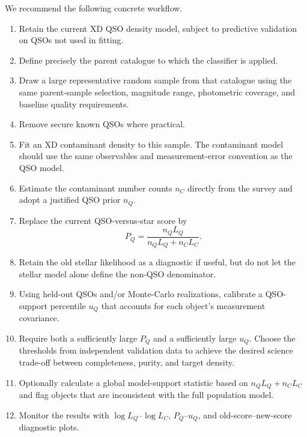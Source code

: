\documentclass[11pt]{article}
\begin{document}
We recommend the following concrete workflow.

\begin{enumerate}[label=\arabic*.]

\item Retain the current XD QSO density model, subject to predictive validation
on QSOs not used in fitting.

\item Define precisely the parent catalogue to which the classifier is
applied.

\item Draw a large representative random sample from that catalogue using the
same parent-sample selection, magnitude range, photometric coverage, and
baseline quality requirements.

\item Remove secure known QSOs where practical.

\item Fit an XD contaminant density to this sample. The contaminant model
should use the same observables and measurement-error convention as the QSO
model.

\item Estimate the contaminant number counts $n_C$ directly from the survey
and adopt a justified QSO prior $n_Q$.

\item Replace the current QSO-versus-star score by
%
\begin{equation}
\boxed{
P_Q
=
\frac{n_Q L_Q}
{n_Q L_Q+n_C L_C}
}.
\end{equation}

\item Retain the old stellar likelihood as a diagnostic if useful, but do not
let the stellar model alone define the non-QSO denominator.

\item Using held-out QSOs and/or Monte-Carlo realizations, calibrate a
QSO-support percentile $u_Q$ that accounts for each object's measurement
covariance.

\item Require both a sufficiently large $P_Q$ and a sufficiently large $u_Q$.
Choose the thresholds from independent validation data to achieve the desired
science trade-off between completeness, purity, and target density.

\item Optionally calculate a global model-support statistic based on
$n_Q L_Q+n_C L_C$ and flag objects that are inconsistent with the full
population model.

\item Monitor the results with $\log L_Q$--$\log L_C$, $P_Q$--$u_Q$, and
old-score--new-score diagnostic plots.
\end{enumerate}
\end{document}
